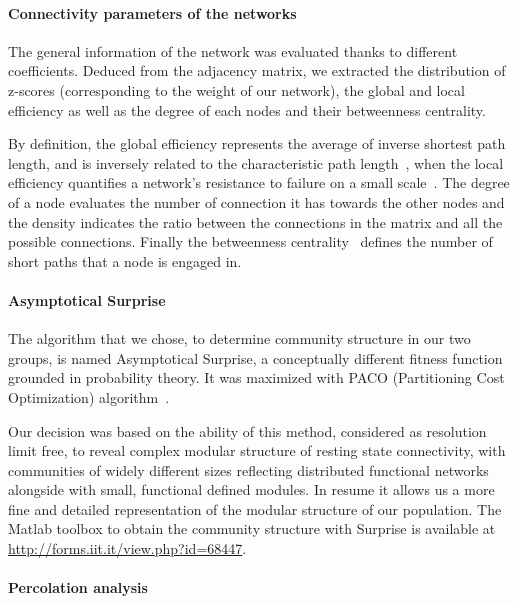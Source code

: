 \paragraph{Connectivity parameters of the networks}

The general information of the network was evaluated thanks to different coefficients.
Deduced from the adjacency matrix, we extracted the distribution of z-scores (corresponding to the weight of our network), the global and local efficiency as well as the degree of each nodes and their betweenness centrality. 

By definition, the global efficiency represents the average of inverse shortest path length, and is inversely related to the characteristic path length~\cite{rubinov2010}, when the local efficiency quantifies a network's resistance to failure on a small scale~\cite{bullmore2009}.
The degree of a node evaluates the number of connection it has towards the other nodes and the density indicates the ratio between the connections in the matrix and all the possible connections.
Finally the betweenness centrality~\cite{freeman1978} defines the number of short paths that a node is engaged in.

\paragraph{Asymptotical Surprise}

The algorithm that we chose, to determine community structure in our two groups, is named Asymptotical Surprise, a conceptually different fitness function grounded in probability theory. It was maximized with PACO (Partitioning Cost Optimization) algorithm~\cite{nicolini2016,nicolini2017}.

Our decision was based on the ability of this method, considered as resolution limit free, to reveal complex modular structure of resting state connectivity, with communities of widely different sizes reflecting distributed functional networks alongside with small, functional defined modules. In resume it allows us a more fine and detailed representation of the modular structure of our population.
The Matlab toolbox to obtain the community structure with Surprise is available at \url{http://forms.iit.it/view.php?id=68447}.

\paragraph{Percolation analysis}

